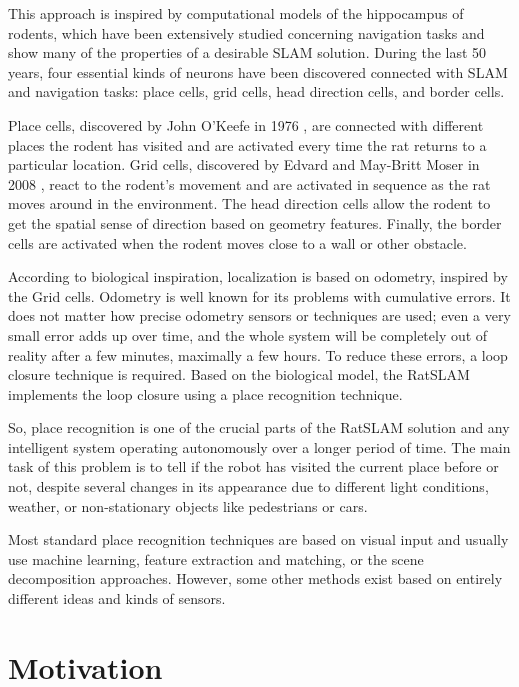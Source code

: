 This approach is inspired by computational models of the hippocampus of rodents, which have been extensively studied concerning navigation tasks and show many of the properties of a desirable SLAM solution. During the last 50 years, four essential kinds of neurons have been discovered connected with SLAM and navigation tasks: place cells, grid cells, head direction cells, and border cells.\par
Place cells, discovered by John O'Keefe in 1976 \cite{placeCells}, are connected with different places the rodent has visited and are activated every time the rat returns to a particular location. Grid cells, discovered by Edvard and May-Britt Moser in 2008 \cite{gridCells}, react to the rodent's movement and are activated in sequence as the rat moves around in the environment. The head direction cells allow the rodent to get the spatial sense of direction based on geometry features. Finally, the border cells are activated when the rodent moves close to a wall or other obstacle.\par
According to biological inspiration, localization is based on odometry, inspired by the Grid cells. Odometry is well known for its problems with cumulative errors. It does not matter how precise odometry sensors or techniques are used; even a very small error adds up over time, and the whole system will be completely out of reality after a few minutes, maximally a few hours. To reduce these errors, a loop closure technique is required. Based on the biological model, the RatSLAM implements the loop closure using a place recognition technique.\par
So, place recognition is one of the crucial parts of the RatSLAM solution and any intelligent system operating autonomously over a longer period of time. The main task of this problem is to tell if the robot has visited the current place before or not, despite several changes in its appearance due to different light conditions, weather, or non-stationary objects like pedestrians or cars.\par
Most standard place recognition techniques are based on visual input and usually use machine learning, feature extraction and matching, or the scene decomposition approaches. However, some other methods exist based on entirely different ideas and kinds of sensors.


\section{Motivation}\label{section:motivation}

